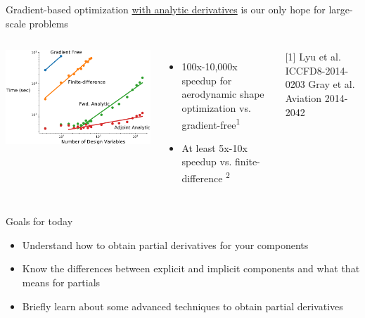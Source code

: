 \documentclass[aspectratio=169, usenames, dvipsnames, 14pt]{beamer}
\begin{document}
\begin{frame}{Gradient-based optimization \underline{with analytic derivatives} is our only hope for large-scale problems}
	
	\begin{columns}
			\includegraphics[scale=.35]{images/slide_5_derivatives.png}
			\begin{itemize}
				\item 100x-10,000x speedup for aerodynamic shape optimization vs. gradient-free\textsuperscript{1}
				\item At least 5x-10x speedup vs. finite-difference \textsuperscript{2}
			\end{itemize}
			\footnotesize [1] Lyu et al. ICCFD8-2014-0203
			\footnotesize \newline [2] Gray et al. Aviation 2014-2042
	\end{columns}
	
\end{frame}
		
\begin{frame}{Goals for today}
	
	\begin{itemize}
		\item Understand how to obtain partial derivatives for your components
		\item Know the differences between explicit and implicit components and what that means for partials
		\item Briefly learn about some advanced techniques to obtain partial derivatives
	\end{itemize}

\end{frame}
\end{document}
